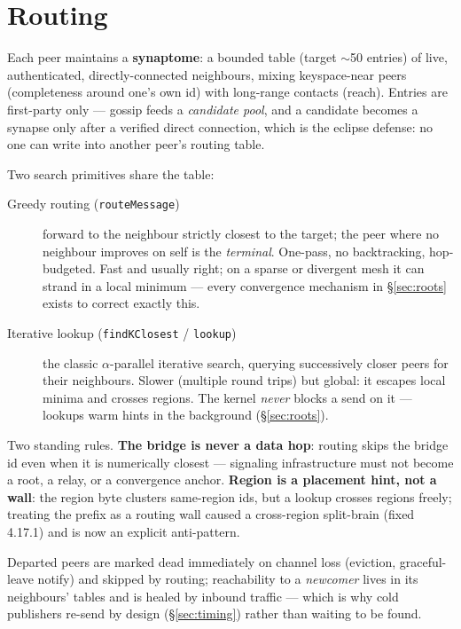 \documentclass[nobib]{tufte-handout}
\begin{document}
\section{Routing}\label{sec:routing}

Each peer maintains a \textbf{synaptome}: a bounded table (target
$\sim$50 entries) of live, authenticated, directly-connected neighbours,
mixing keyspace-near peers (completeness around one's own id) with
long-range contacts (reach). Entries are first-party only --- gossip
feeds a \emph{candidate pool}, and a candidate becomes a synapse only
after a verified direct connection, which is the eclipse defense: no
one can write into another peer's routing table.

Two search primitives share the table:

\begin{description}
\item[Greedy routing (\texttt{routeMessage})] forward to the neighbour
  strictly closest to the target; the peer where no neighbour improves
  on self is the \emph{terminal}. One-pass, no backtracking, hop-budgeted.
  Fast and usually right; on a sparse or divergent mesh it can strand in
  a local minimum --- every convergence mechanism in
  \S\ref{sec:roots} exists to correct exactly this.
\item[Iterative lookup (\texttt{findKClosest} / \texttt{lookup})] the
  classic $\alpha$-parallel iterative search, querying successively
  closer peers for their neighbours. Slower (multiple round trips) but
  global: it escapes local minima and crosses regions. The kernel
  \emph{never} blocks a send on it --- lookups warm hints in the
  background (\S\ref{sec:roots}).
\end{description}

\noindent Two standing rules. \textbf{The bridge is never a data hop}:
routing skips the bridge id even when it is numerically closest ---
signaling infrastructure must not become a root, a relay, or a
convergence anchor. \textbf{Region is a placement hint, not a wall}:
the region byte clusters same-region ids, but a lookup crosses regions
freely; treating the prefix as a routing wall caused a cross-region
split-brain (fixed 4.17.1) and is now an explicit anti-pattern.

Departed peers are marked dead immediately on channel loss (eviction,
graceful-leave notify) and skipped by routing; reachability to a
\emph{newcomer} lives in its neighbours' tables and is healed by inbound
traffic --- which is why cold publishers re-send by design
(\S\ref{sec:timing}) rather than waiting to be found.
\end{document}
